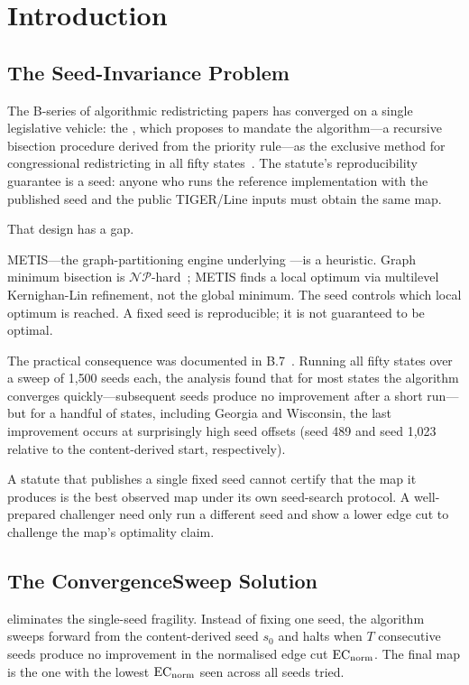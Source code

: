 \section{Introduction}
\label{sec:introduction}

\subsection{The Seed-Invariance Problem}

The B-series of algorithmic redistricting papers has converged on a single
legislative vehicle: the \dia{}, which proposes to mandate the \ar{}
algorithm---a recursive bisection procedure derived from the \hh{} priority
rule---as the exclusive method for congressional redistricting in all fifty
states~\citep{b02paper}.
The statute's reproducibility guarantee is a seed: anyone who runs the
reference implementation with the published seed and the public TIGER/Line
inputs must obtain the same map.

That design has a gap.

METIS---the graph-partitioning engine underlying \ar{}---is a heuristic.
Graph minimum bisection is $\mathcal{NP}$-hard~\citep{b6paper}; METIS finds a
local optimum via multilevel Kernighan-Lin refinement, not the global minimum.
The seed controls which local optimum is reached.
A fixed seed is reproducible; it is not guaranteed to be optimal.

The practical consequence was documented in B.7~\citep{b7paper}.
Running all fifty states over a sweep of 1{,}500 seeds each, the analysis
found that for most states the algorithm converges quickly---subsequent seeds
produce no improvement after a short run---but for a handful of states,
including Georgia and Wisconsin, the last improvement occurs at surprisingly
high seed offsets (seed 489 and seed 1{,}023 relative to the content-derived
start, respectively).

A statute that publishes a single fixed seed cannot certify that the map it
produces is the best observed map under its own seed-search protocol.
A well-prepared challenger need only run a different seed and show a
lower edge cut to challenge the map's optimality claim.

\subsection{The ConvergenceSweep Solution}

\cs{} eliminates the single-seed fragility.
Instead of fixing one seed, the algorithm sweeps forward from the
content-derived seed $s_0$ and halts when $T$ consecutive seeds produce no
improvement in the normalised edge cut $\mathrm{EC}_{\mathrm{norm}}$.
The final map is the one with the lowest $\mathrm{EC}_{\mathrm{norm}}$ seen across all seeds tried.


